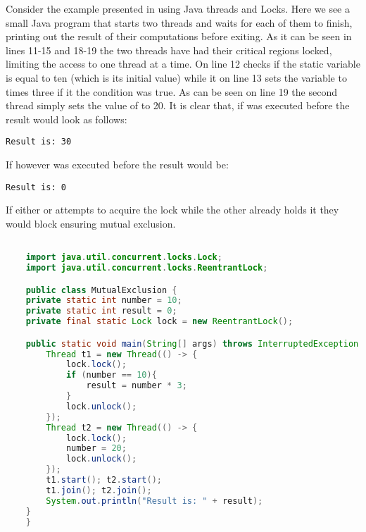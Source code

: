 Consider the example presented in  using Java threads and Locks. Here we see a small Java program that starts two threads and waits for each of them to finish, printing out the result of their computations before exiting. As it can be seen in lines 11-15 and 18-19 the two threads have had their critical regions locked, limiting the access to one thread at a time. On line 12  checks if the static variable  is equal to ten (which is its initial value) while it on line 13 sets the  variable to  times three if it the condition was true. As can be seen on line 19 the second thread simply sets the value of  to 20. It is clear that, if  was executed before  the result would look as follows:
\begin{verbatim}
Result is: 30
\end{verbatim}
If however  was executed before  the result would be:
\begin{verbatim}
Result is: 0
\end{verbatim}
If either  or  attempts to acquire the lock while the other already holds it they would block ensuring mutual exclusion.

\begin{lstlisting}[float,label=lst:mutualexclusion,
  caption={Mutual exclusion in Java using a lock},
  language=Java,  
  showspaces=false,
  showtabs=false,
  breaklines=true,
  showstringspaces=false,
  breakatwhitespace=true,
  commentstyle=\color{greencomments},
  keywordstyle=\color{bluekeywords},
  stringstyle=\color{redstrings}]  % Start your code-block

	import java.util.concurrent.locks.Lock;
	import java.util.concurrent.locks.ReentrantLock;

	public class MutualExclusion {
    private static int number = 10;
    private static int result = 0;
    private final static Lock lock = new ReentrantLock();

    public static void main(String[] args) throws InterruptedException {
        Thread t1 = new Thread(() -> {
            lock.lock();
            if (number == 10){
                result = number * 3;
            }
            lock.unlock();
        });
        Thread t2 = new Thread(() -> {
            lock.lock();
            number = 20;
            lock.unlock();
        });
        t1.start(); t2.start();
        t1.join(); t2.join();
        System.out.println("Result is: " + result);
    }
	}
\end{lstlisting}

